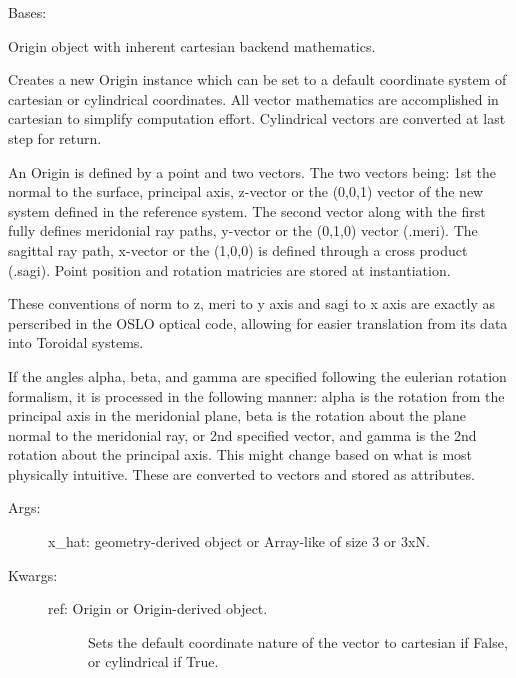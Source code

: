\documentclass[letterpaper,10pt,english]{sphinxmanual}
\begin{document}
\begin{fulllineitems}
\label{TRIPPy:TRIPPy.surface.Rect}
Bases: {\hyperref[TRIPPy:TRIPPy.surface.Surf]{}}

Origin object with inherent cartesian backend mathematics.

Creates a new Origin instance which can be set to a default 
coordinate system of cartesian or cylindrical coordinates.
All vector mathematics are accomplished in cartesian to 
simplify computation effort. Cylindrical vectors are
converted at last step for return.

An Origin is defined by a point and two vectors. The two 
vectors being: 1st the normal to the surface, principal axis,
z-vector or the (0,0,1) vector of the new system defined in
the reference system. The second vector along with the 
first fully defines meridonial ray paths, y-vector or the
(0,1,0) vector (.meri). The sagittal ray path, x-vector or
the (1,0,0) is defined through a cross product (.sagi).
Point position and rotation matricies are stored at
instantiation.

These conventions of norm to z, meri to y axis and sagi to
x axis are exactly as perscribed in the OSLO optical code,
allowing for easier translation from its data into Toroidal
systems.

If the angles alpha, beta, and gamma are specified following
the eulerian rotation formalism, it is processed in the 
following manner: alpha is the rotation from the principal
axis in the meridonial plane, beta is the rotation about the
plane normal to the meridonial ray, or 2nd specified vector,
and gamma is the 2nd rotation about the principal axis. 
This might change based on what is most physically intuitive.
These are converted to vectors and stored as attributes.
\begin{description}
\item[{Args:}] \leavevmode
x\_hat: geometry-derived object or Array-like of size 3 or 3xN.

\item[{Kwargs:}] \leavevmode\begin{description}
\item[{ref: Origin or Origin-derived object.}] \leavevmode
Sets the default coordinate nature of the vector to 
cartesian if False, or cylindrical if True.


\end{description}
\end{description}
\end{fulllineitems}
\end{document}
